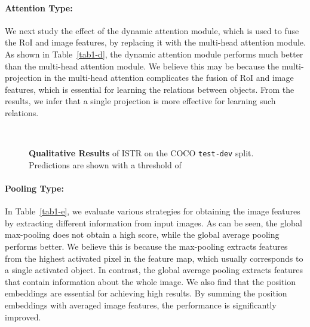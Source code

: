 \documentclass[10pt,twocolumn,letterpaper]{article}
\begin{document}
\paragraph{Attention Type:} We next study the effect of the dynamic attention module, which is used to fuse the RoI and image features, by replacing it with the multi-head attention module.
As shown in Table~\ref{tab1-d}, the dynamic attention module performs much better than the multi-head attention module.
We believe this may be because the multi-projection in the multi-head attention complicates the fusion of RoI and image features, which is essential for learning the relations between objects.
From the results, we infer that a single projection is more effective for learning such relations.
\begin{figure*}[t]
\centering
{}\vspace{-3mm}\\
\vspace{-2.mm}
\caption{
\textbf{Qualitative Results} of ISTR on the COCO \texttt{test-dev} split. Predictions are shown with a threshold of 
}\vspace{-0.5mm}
\label{fig4}
\end{figure*}
\paragraph{Pooling Type:} In Table~\ref{tab1-e}, we evaluate various strategies for obtaining the image features by extracting different information from input images.
As can be seen, the global max-pooling does not obtain a high score, while the global average pooling performs better.
We believe this is because the max-pooling extracts features from the highest activated pixel in the feature map, which usually corresponds to a single activated object.
In contrast, the global average pooling extracts features that contain information about the whole image.
We also find that the position embeddings are essential for achieving high results.
By summing the position embeddings with averaged image features, the performance is significantly improved.
\end{document}
